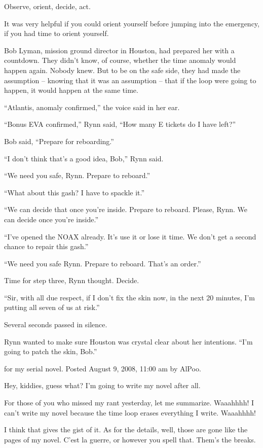 Observe, orient, decide, act.

It was very helpful if you could orient yourself before jumping into the emergency, if you had time to orient yourself.

Bob Lyman, mission ground director in Houston, had prepared her with a countdown. They didn't know, of course, whether the time anomaly would happen again. Nobody knew. But to be on the safe side, they had made the assumption – knowing that it was an assumption – that if the loop were going to happen, it would happen at the same time.

``Atlantis, anomaly confirmed,'' the voice said in her ear.

``Bonus EVA confirmed,'' Rynn said, ``How many E tickets do I have left?''

Bob said, ``Prepare for reboarding.''

``I don't think that's a good idea, Bob,'' Rynn said.

``We need you safe, Rynn. Prepare to reboard.''

``What about this gash? I have to spackle it.''

``We can decide that once you're inside. Prepare to reboard. Please, Rynn. We can decide once you're inside.''

``I've opened the NOAX already. It's use it or lose it time. We don't get a second chance to repair this gash.''

``We need you safe Rynn. Prepare to reboard. That's an order.''

Time for step three, Rynn thought. Decide.

``Sir, with all due respect, if I don't fix the skin now, in the next 20 minutes, I'm putting all seven of us at risk.''

Several seconds passed in silence.

Rynn wanted to make sure Houston was crystal clear about her intentions. ``I'm going to patch the skin, Bob.''




 for my serial novel. Posted August 9, 2008, 11:00 am by AlPoo.

Hey, kiddies, guess what? I'm going to write my novel after all.

For those of you who missed my rant yesterday, let me summarize. Waaahhhh! I can't write my novel because the time loop erases everything I write. Waaahhhh!

I think that gives the gist of it. As for the details, well, those are gone like the pages of my novel. C'est la guerre, or however you spell that. Them's the breaks.

